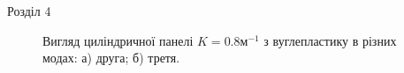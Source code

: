 \documentclass[8pt]{beamer}
\numberwithin{figure}{section}
\numberwithin{equation}{section}
\numberwithin{table}{section}
\begin{document}
\begin{frame}{Розділ 4}

\begin{figure}[h]
\begin{minipage}[h]{0.49\linewidth}
\end{minipage}
\hfill
\begin{minipage}[h]{0.49\linewidth}
\end{minipage}
\caption{Вигляд циліндричної панелі $K=0.8\text{м}^{-1}$ з вуглепластику в різних модах: а) друга; б) третя.}
\end{figure}

\end{frame}
\end{document}
